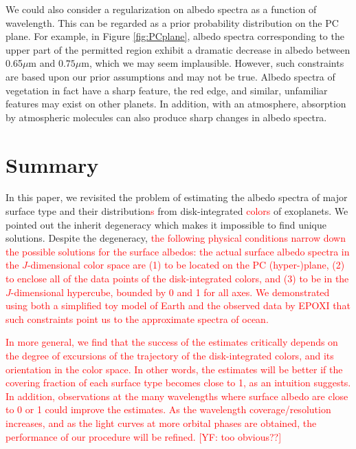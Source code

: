\documentclass[iop,numberedappendix,apj]{emulateapj}
\def\edit#1{\textcolor{red}{#1}}
\begin{document}
We could also consider a regularization on albedo spectra as a function of wavelength. 
This can be regarded as a prior probability distribution on the PC plane. 
For example, in Figure \ref{fig:PCplane}, albedo spectra corresponding to the upper part of the permitted region exhibit a dramatic decrease in albedo between 0.65$\mu $m and $0.75\mu $m, which we may seem implausible. 
However, such constraints are based upon our prior assumptions and may not be true. 
Albedo spectra of vegetation in fact have a sharp feature, the red edge, and similar, unfamiliar features may exist on other planets. 
In addition, with an atmosphere, absorption by atmospheric molecules can also produce sharp changes in albedo spectra. 


\section{Summary}
\label{s:conclusion}

In this paper, we revisited the problem of estimating the albedo spectra of major surface type and their distribution\edit{s} from disk-integrated \edit{colors} of exoplanets. 
We pointed out the inherit degeneracy which makes it impossible to find unique solutions. 
Despite the degeneracy, \edit{the following physical conditions narrow down the possible  solutions for the surface albedos:
the actual surface albedo spectra in the $J$-dimensional color space are (1) to be located on the PC (hyper-)plane, (2) to enclose all of the data points of the disk-integrated colors, and (3) to be in the $J$-dimensional hypercube, bounded by 0 and 1 for all axes. %
We demonstrated using both a simplified toy model of Earth and the observed data by EPOXI that such constraints point us to the approximate spectra of ocean. }

\edit{In more general, we find that the success of the estimates critically depends on the degree of excursions of the trajectory of the disk-integrated colors, and its orientation in the color space.  %
In other words, the estimates will be better if the covering fraction of each surface type becomes close to 1, as an intuition suggests. 
In addition, observations at the many wavelengths where surface albedo are close to 0 or 1 could improve the estimates. }
\edit{As the wavelength coverage/resolution increases, and as the light curves at more orbital phases are obtained, the performance of our procedure will be refined. [YF: too obvious??]}
\end{document}
